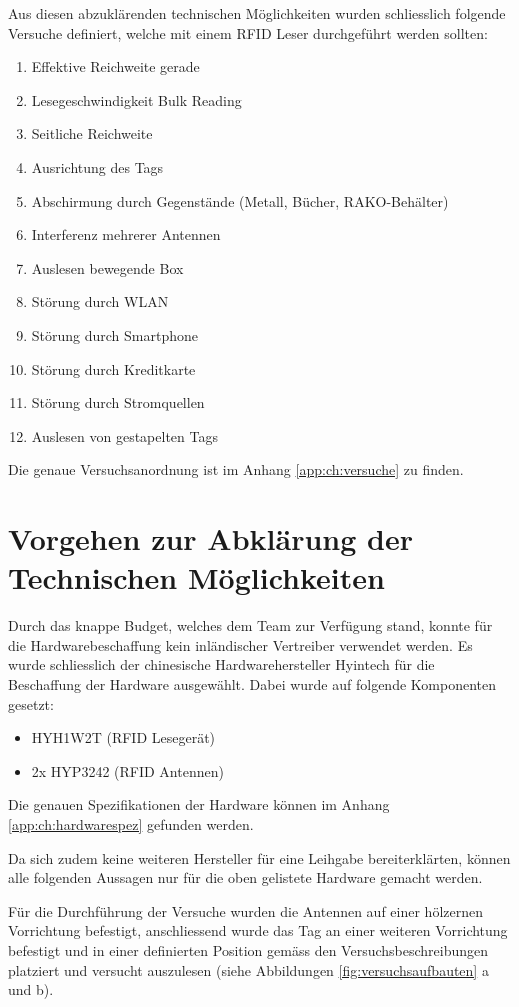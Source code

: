 Aus diesen abzuklärenden technischen Möglichkeiten wurden schliesslich folgende Versuche definiert, welche mit einem RFID Leser durchgeführt werden sollten:
\begin{enumerate}
	\item Effektive Reichweite gerade
	\item Lesegeschwindigkeit Bulk Reading
	\item Seitliche Reichweite
	\item Ausrichtung des Tags
	\item Abschirmung durch Gegenstände (Metall, Bücher, RAKO-Behälter)
	\item Interferenz mehrerer Antennen
	\item Auslesen bewegende Box
	\item Störung durch WLAN
	\item Störung durch Smartphone
	\item Störung durch Kreditkarte
	\item Störung durch Stromquellen
	\item Auslesen von gestapelten Tags
\end{enumerate}

Die genaue Versuchsanordnung ist im Anhang \ref{app:ch:versuche} zu finden.

\section{Vorgehen zur Abklärung der Technischen Möglichkeiten}

Durch das knappe Budget, welches dem Team zur Verfügung stand, konnte für die Hardwarebeschaffung kein inländischer Vertreiber verwendet werden. Es wurde schliesslich der chinesische Hardwarehersteller Hyintech für die Beschaffung der Hardware ausgewählt. Dabei wurde auf folgende Komponenten gesetzt:

\begin{itemize}
	\item HYH1W2T (RFID Lesegerät)
	\item 2x HYP3242 (RFID Antennen)
\end{itemize}

Die genauen Spezifikationen der Hardware können im Anhang \ref{app:ch:hardwarespez} gefunden werden.

Da sich zudem keine weiteren Hersteller für eine Leihgabe bereiterklärten, können alle folgenden Aussagen nur für die oben gelistete Hardware gemacht werden.

Für die Durchführung der Versuche wurden die Antennen auf einer hölzernen Vorrichtung befestigt, anschliessend wurde das Tag an einer weiteren Vorrichtung befestigt und in einer definierten Position gemäss den Versuchsbeschreibungen platziert und versucht auszulesen (siehe Abbildungen \ref{fig:versuchsaufbauten} a und b).


